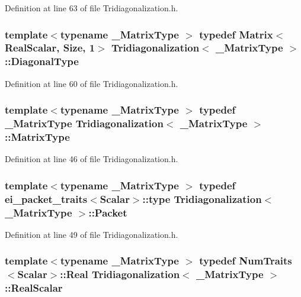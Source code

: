 Definition at line 63 of file Tridiagonalization.\-h.

\hypertarget{class_tridiagonalization_a5ea34cf11c675c0a45c309aa7cb662b0}{
\subsubsection[{Diagonal\-Type}]{\setlength{\rightskip}{0pt plus 5cm}template$<$typename \-\_\-\-Matrix\-Type $>$ typedef {\bf Matrix}$<${\bf Real\-Scalar}, {\bf Size}, 1$>$ {\bf Tridiagonalization}$<$ \-\_\-\-Matrix\-Type $>$\-::{\bf Diagonal\-Type}}}\label{class_tridiagonalization_a5ea34cf11c675c0a45c309aa7cb662b0}


Definition at line 60 of file Tridiagonalization.\-h.

\hypertarget{class_tridiagonalization_a527ab9a2b51075a625d5a7f1ef44b3c6}{
\subsubsection[{Matrix\-Type}]{\setlength{\rightskip}{0pt plus 5cm}template$<$typename \-\_\-\-Matrix\-Type $>$ typedef \-\_\-\-Matrix\-Type {\bf Tridiagonalization}$<$ \-\_\-\-Matrix\-Type $>$\-::{\bf Matrix\-Type}}}\label{class_tridiagonalization_a527ab9a2b51075a625d5a7f1ef44b3c6}


Definition at line 46 of file Tridiagonalization.\-h.

\hypertarget{class_tridiagonalization_a243d272d7194d42e8f1bdfa4df292568}{
\subsubsection[{Packet}]{\setlength{\rightskip}{0pt plus 5cm}template$<$typename \-\_\-\-Matrix\-Type $>$ typedef {\bf ei\-\_\-packet\-\_\-traits}$<${\bf Scalar}$>$\-::{\bf type} {\bf Tridiagonalization}$<$ \-\_\-\-Matrix\-Type $>$\-::{\bf Packet}}}\label{class_tridiagonalization_a243d272d7194d42e8f1bdfa4df292568}


Definition at line 49 of file Tridiagonalization.\-h.

\hypertarget{class_tridiagonalization_a8c7be80d039862e1f930e22332ba1064}{
\subsubsection[{Real\-Scalar}]{\setlength{\rightskip}{0pt plus 5cm}template$<$typename \-\_\-\-Matrix\-Type $>$ typedef {\bf Num\-Traits}$<${\bf Scalar}$>$\-::Real {\bf Tridiagonalization}$<$ \-\_\-\-Matrix\-Type $>$\-::{\bf Real\-Scalar}}}\label{class_tridiagonalization_a8c7be80d039862e1f930e22332ba1064}


